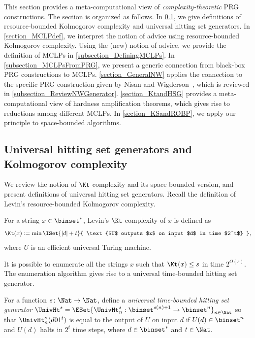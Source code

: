 \documentclass{toc}
\begin{document}
%
This section provides a meta-computational view of
\emph{complexity-theoretic} PRG constructions.
The section is organized as follows.
In \cref{subsection_UniversalHSG},
we give definitions of resource-bounded Kolmogorov complexity and universal hitting set generators.
In \cref{section_MCLPdef},
we interpret the notion of advice
using resource-bounded Kolmogorov complexity.
Using the (new) notion of advice,
we provide the definition of MCLPs in \cref{subsection_DefiningMCLPs}.
In \cref{subsection_MCLPsFromPRG}, we present
a generic connection from black-box PRG constructions to MCLPs.
\cref{section_GeneralNW} applies the connection
to the specific PRG construction given by Nisan and Wigderson~\cite{NisanW94_jcss_journals},
which is reviewed in \cref{subsection_ReviewNWGenerator}.
\cref{section_KtandHSG} provides
a meta-computational view of hardness amplification theorems,
which gives rise to reductions among different MCLPs.
In \cref{section_KSandROBP},
we apply our principle to space-bounded algorithms.

%
%
%
%
%
%
%
%
%
%

\subsection{Universal hitting set generators and Kolmogorov complexity}
\label{subsection_UniversalHSG}


We review the notion of $\Kt$-complexity and its space-bounded version, and present
definitions of universal hitting set generators.
Recall the definition of Levin's resource-bounded Kolmogorov complexity.
\begin{definition}
  For a string $x \in \binset^*$, Levin's $\Kt$ complexity of $x$ is defined as
  $$
    \Kt(x) := \min \ISet { |d| + t } { \text{$U$ outputs $x$ on input $d$ in time $2^t$} },
  $$
  where $U$ is an efficient universal Turing machine.
\end{definition}

It is possible to enumerate all the strings $x$ such that $\Kt(x) \le s$
in time $2^{O(s)}$.
The enumeration algorithm gives rise to a universal time-bounded hitting set generator.
\begin{definition}
  For a function $s \colon \Nat \to \Nat$,
  define
  a \emph{universal time-bounded hitting set generator}
  $\UnivHt^s = \ESet{ \UnivHt^s_n : \binset^{s(n)+1} \to \binset^n }_{n \in \Nat}$ so that
  $\UnivHt^s_n(d 0 1^t)$ is equal to the output of $U$ on input $d$
  if $U(d) \in \binset^n$ and $U(d)$ halts in $2^t$ time steps,
  where $d \in \binset^*$ and $t \in \Nat$.
\end{definition}
\end{document}
